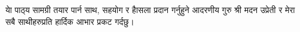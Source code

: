 \begin{titlepage}
\newpage
\vspace*{\fill}
\thispagestyle{empty}

\newpage
\vspace*{\fill}
\thispagestyle{empty}
\begin{center}
	\begin{nepali}
		{\large {याे पाठ्‍य सामग्री तयार पार्न साथ, सहयोग र हाैसला प्रदान गर्नुहुने आदरणीय गुरु श्री मदन उप्रेती र मेरा सबै साथीहरुप्रति हार्दिक आभार प्रकट गर्दछु।}}
	\end{nepali}
\end{center}
\vspace*{\fill}
\end{titlepage}


